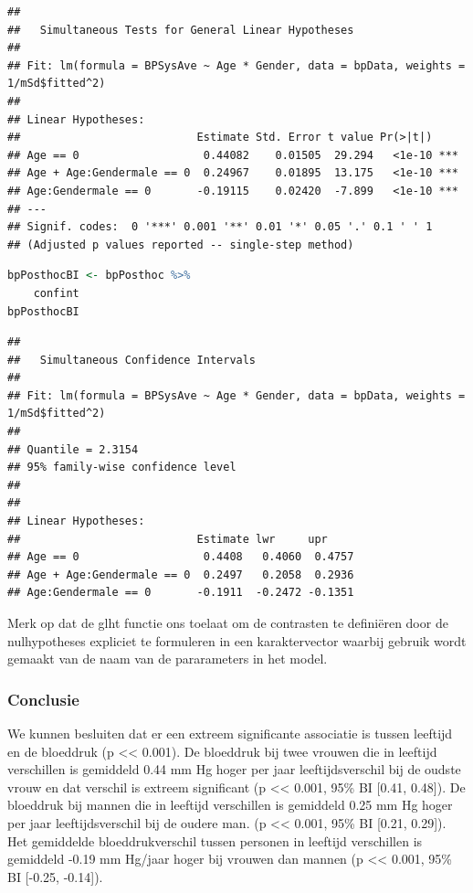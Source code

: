 \documentclass[
  12pt,dutch,coursenotes]{book}
\theoremstyle{definition}
\theoremstyle{definition}
\theoremstyle{definition}
\theoremstyle{definition}
\theoremstyle{remark}
\begin{document}
\begin{lstlisting}
## 
##   Simultaneous Tests for General Linear Hypotheses
## 
## Fit: lm(formula = BPSysAve ~ Age * Gender, data = bpData, weights = 1/mSd$fitted^2)
## 
## Linear Hypotheses:
##                           Estimate Std. Error t value Pr(>|t|)    
## Age == 0                   0.44082    0.01505  29.294   <1e-10 ***
## Age + Age:Gendermale == 0  0.24967    0.01895  13.175   <1e-10 ***
## Age:Gendermale == 0       -0.19115    0.02420  -7.899   <1e-10 ***
## ---
## Signif. codes:  0 '***' 0.001 '**' 0.01 '*' 0.05 '.' 0.1 ' ' 1
## (Adjusted p values reported -- single-step method)
\end{lstlisting}

\begin{lstlisting}[language=R]
bpPosthocBI <- bpPosthoc %>%
    confint
bpPosthocBI
\end{lstlisting}

\begin{lstlisting}
## 
##   Simultaneous Confidence Intervals
## 
## Fit: lm(formula = BPSysAve ~ Age * Gender, data = bpData, weights = 1/mSd$fitted^2)
## 
## Quantile = 2.3154
## 95% family-wise confidence level
##  
## 
## Linear Hypotheses:
##                           Estimate lwr     upr    
## Age == 0                   0.4408   0.4060  0.4757
## Age + Age:Gendermale == 0  0.2497   0.2058  0.2936
## Age:Gendermale == 0       -0.1911  -0.2472 -0.1351
\end{lstlisting}

Merk op dat de glht functie ons toelaat om de contrasten te definiëren door de nulhypotheses expliciet te formuleren in een karaktervector waarbij gebruik wordt gemaakt van de naam van de pararameters in het model.

\hypertarget{conclusie-2}{%
\subsubsection{Conclusie}\label{conclusie-2}}

We kunnen besluiten dat er een extreem significante associatie is tussen leeftijd en de bloeddruk (p \textless\textless{} 0.001).
De bloeddruk bij twee vrouwen die in leeftijd verschillen is gemiddeld 0.44 mm Hg hoger per jaar leeftijdsverschil bij de oudste vrouw en dat verschil is extreem significant (p \textless\textless{} 0.001, 95\% BI {[}0.41, 0.48{]}).
De bloeddruk bij mannen die in leeftijd verschillen is gemiddeld 0.25 mm Hg hoger per jaar leeftijdsverschil bij de oudere man. (p \textless\textless{} 0.001, 95\% BI {[}0.21, 0.29{]}).
Het gemiddelde bloeddrukverschil tussen personen in leeftijd verschillen is gemiddeld -0.19 mm Hg/jaar hoger bij vrouwen dan mannen (p \textless\textless{} 0.001, 95\% BI {[}-0.25, -0.14{]}).
\end{document}
